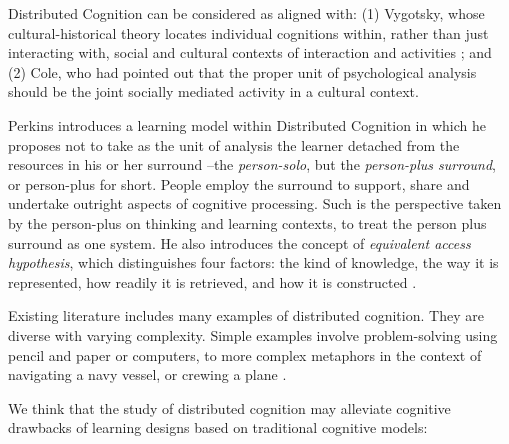 \documentclass[10pt,twocolumn,ieeetran]{article}
\begin{document}
Distributed Cognition can be considered as aligned with: (1) Vygotsky, whose cultural-historical theory \cite{Wertsch} locates individual cognitions within, rather than just interacting with, social and cultural contexts of interaction and activities \cite{Salomon}; and (2) Cole, who had pointed out \cite{Cole} that the proper unit of psychological analysis should be the joint socially mediated activity in a cultural context.


Perkins \cite{Perkins}\cite{Perkins2} introduces a learning model within Distributed Cognition in which he proposes not to take as the unit of analysis the learner detached from the resources in his or her surround --the {\it person-solo}, but the {\it person-plus surround}, or person-plus for short. People employ the surround to support, share and undertake outright aspects of cognitive processing. Such is the perspective taken by the person-plus on thinking and learning contexts, to treat the person plus surround as one system.
He also introduces the concept of {\it equivalent access hypothesis}, which distinguishes four factors: the kind of knowledge, the way it is represented, how readily it is retrieved, and how it is constructed \cite{Salomon}.

Existing literature includes many examples of distributed cognition. They are diverse with varying complexity. Simple examples involve problem-solving using pencil and paper or computers, to more complex metaphors in the context of navigating a navy vessel, or crewing a plane \cite{Hutchins95}. 


We think that the study of distributed cognition may alleviate cognitive drawbacks of learning designs based on traditional cognitive models: 
\end{document}
